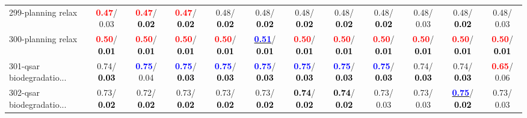 \begin{table}[h]
\begin{center}
{\begin{tabular}{lc|c|c|c|c|c|c|c|c|c|c}
299-planning relax & \textcolor{red}{\textbf{  0.47}}/  0.03 & \textcolor{red}{\textbf{  0.47}}/\textcolor{black}{\textbf{  0.02}} & \textcolor{red}{\textbf{  0.47}}/\textcolor{black}{\textbf{  0.02}} &   0.48/\textcolor{black}{\textbf{  0.02}} &   0.48/\textcolor{black}{\textbf{  0.02}} &   0.48/\textcolor{black}{\textbf{  0.02}} &   0.48/\textcolor{black}{\textbf{  0.02}} &   0.48/\textcolor{black}{\textbf{  0.02}} &   0.48/  0.03 &   0.48/\textcolor{black}{\textbf{  0.02}} &   0.48/  0.03 \\
300-planning relax & \textcolor{red}{\textbf{  0.50}}/\textcolor{black}{\textbf{  0.01}} & \textcolor{red}{\textbf{  0.50}}/\textcolor{black}{\textbf{  0.01}} & \textcolor{red}{\textbf{  0.50}}/\textcolor{black}{\textbf{  0.01}} & \textcolor{red}{\textbf{  0.50}}/\textcolor{black}{\textbf{  0.01}} & \underline{\textcolor{blue}{\textbf{  0.51}}}/\textcolor{black}{\textbf{  0.01}} & \textcolor{red}{\textbf{  0.50}}/\textcolor{black}{\textbf{  0.01}} & \textcolor{red}{\textbf{  0.50}}/\textcolor{black}{\textbf{  0.01}} & \textcolor{red}{\textbf{  0.50}}/\textcolor{black}{\textbf{  0.01}} & \textcolor{red}{\textbf{  0.50}}/\textcolor{black}{\textbf{  0.01}} & \textcolor{red}{\textbf{  0.50}}/\textcolor{black}{\textbf{  0.01}} & \textcolor{red}{\textbf{  0.50}}/\textcolor{black}{\textbf{  0.01}} \\
301-qsar biodegradatio... &   0.74/\textcolor{black}{\textbf{  0.03}} & \textcolor{blue}{\textbf{  0.75}}/  0.04 & \textcolor{blue}{\textbf{  0.75}}/\textcolor{black}{\textbf{  0.03}} & \textcolor{blue}{\textbf{  0.75}}/\textcolor{black}{\textbf{  0.03}} & \textcolor{blue}{\textbf{  0.75}}/\textcolor{black}{\textbf{  0.03}} & \textcolor{blue}{\textbf{  0.75}}/\textcolor{black}{\textbf{  0.03}} & \textcolor{blue}{\textbf{  0.75}}/\textcolor{black}{\textbf{  0.03}} & \textcolor{blue}{\textbf{  0.75}}/\textcolor{black}{\textbf{  0.03}} &   0.74/\textcolor{black}{\textbf{  0.03}} &   0.74/\textcolor{black}{\textbf{  0.03}} & \textcolor{red}{\textbf{  0.65}}/  0.06 \\
302-qsar biodegradatio... &   0.73/\textcolor{black}{\textbf{  0.02}} &   0.72/\textcolor{black}{\textbf{  0.02}} &   0.73/\textcolor{black}{\textbf{  0.02}} &   0.73/\textcolor{black}{\textbf{  0.02}} &   0.73/\textcolor{black}{\textbf{  0.02}} & \textcolor{black}{\textbf{  0.74}}/\textcolor{black}{\textbf{  0.02}} & \textcolor{black}{\textbf{  0.74}}/\textcolor{black}{\textbf{  0.02}} &   0.73/  0.03 &   0.73/  0.03 & \underline{\textcolor{blue}{\textbf{  0.75}}}/\textcolor{black}{\textbf{  0.02}} &   0.73/  0.03 \\ \hline

\end{tabular}}
\end{center}
\end{table}
